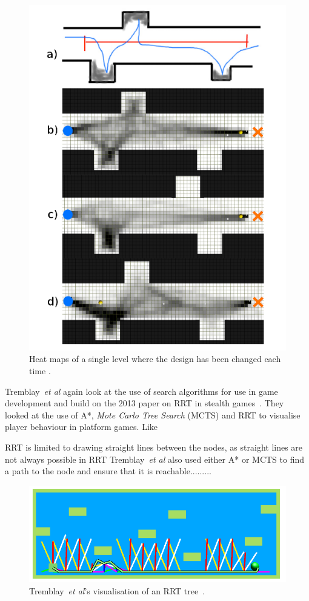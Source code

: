 \documentclass[journal]{IEEEtran}
\begin{document}
\begin{figure}[h]
	\includegraphics[width=1.0\linewidth]{TremblayHeatMap.png}
	\caption{ Heat maps of a single level where the design has been changed each time \cite{Tremblay2013}.}
	\label{TremblayHeatMap}
\end{figure} 

 Tremblay~\textit{et al} again look at the use of search algorithms for use in game development and build on the 2013 paper on RRT in stealth games~\cite{Tremblay2014}. They looked at the use of A*, \textit{Mote Carlo Tree Search} (MCTS) and RRT to visualise player behaviour in platform games. Like 

RRT is limited to drawing straight lines between the nodes, as straight lines are not always possible in RRT  Tremblay~\textit{et al} also used either A* or MCTS to find a path to the node and ensure that it is reachable.........

\begin{figure}[h]
	\includegraphics[width=1.0\linewidth]{Tremblay2014.png}
	\caption{ Tremblay~\textit{et al}'s visualisation of an RRT tree~\cite{Tremblay2014}.}
	\label{Tremblay2014}
\end{figure} 
\end{document}
